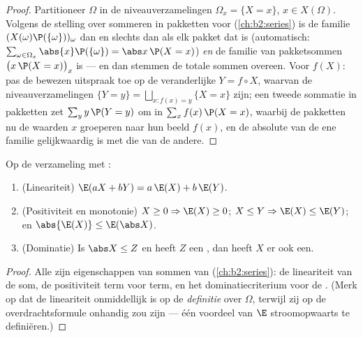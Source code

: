 \begin{proof}
Partitioneer $\Omega$ in de niveauverzamelingen $\Omega_x = \{X =
x\}$, $x \in X(\Omega)$. Volgens de stelling over sommeren in
pakketten voor  (\cref{ch:b2:series}) is de
familie $(X(\omega)\P(\{\omega\}))_\omega$  dan en
slechts dan als elk pakket dat is (automatisch: $\sum_{\omega \in
\Omega_x}\abs{x}\P(\{\omega\}) = \abs x\,\P(X = x)$) \emph{en} de
familie van pakketsommen $\bigl(x\,\P(X = x)\bigr)_x$ 
is --- en dan stemmen de totale sommen overeen. Voor $f(X)$: pas de
bewezen uitspraak toe op de veranderlijke $Y = f \circ X$, waarvan
de niveauverzamelingen $\{Y = y\} = \bigsqcup_{x : f(x) = y}\{X =
x\}$ zijn; een tweede sommatie in pakketten zet $\sum_y y\,\P(Y =
y)$ om in $\sum_x f(x)\,\P(X = x)$, waarbij de pakketten nu de
waarden $x$ groeperen naar hun beeld $f(x)$, en de absolute
 van de ene familie gelijkwaardig is met die van de
andere.
\end{proof}

\begin{theorem}\label{thm:b2:randomvar:linearity}
Op de verzameling  met :
\begin{enumerate}
\item (Lineariteit) $\E(aX + bY) = a\,\E(X) + b\,\E(Y)$.
\item (Positiviteit en monotonie) $X \geq 0 \Rightarrow \E(X) \geq
0$; $X \leq Y \Rightarrow \E(X) \leq \E(Y)$; en $\abs{\E(X)} \leq
\E(\abs X)$.
\item (Dominatie) Is $\abs X \leq Z$ en heeft $Z$ een
, dan heeft $X$ er ook een.
\end{enumerate}
\end{theorem}

\begin{proof}
Alle zijn eigenschappen van sommen van 
(\cref{ch:b2:series}): de lineariteit van de som, de positiviteit
term voor term, en het dominatiecriterium voor de .
(Merk op dat de lineariteit onmiddellijk is op de \emph{definitie}
over $\Omega$, terwijl zij op de overdrachtsformule onhandig zou
zijn --- één voordeel van $\E$ stroomopwaarts te definiëren.)
\end{proof}


